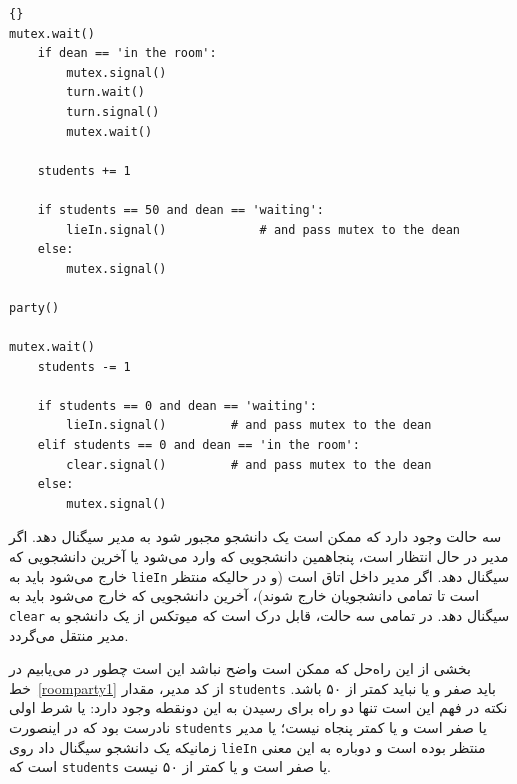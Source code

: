 \documentclass{book}
\begin{document}
\newpage
\begin{latin}
\begin{lstlisting}[title=\rl{راه‌حل اتاق پارتی (دانشجو)}]{}
mutex.wait()
    if dean == 'in the room':
        mutex.signal()
        turn.wait()
        turn.signal()
        mutex.wait()

    students += 1

    if students == 50 and dean == 'waiting':
        lieIn.signal()             # and pass mutex to the dean
    else:
        mutex.signal()

party()

mutex.wait()
    students -= 1

    if students == 0 and dean == 'waiting':
        lieIn.signal()         # and pass mutex to the dean
    elif students == 0 and dean == 'in the room':
        clear.signal()         # and pass mutex to the dean
    else:
        mutex.signal()
\end{lstlisting}
\end{latin}

    سه حالت وجود دارد که ممکن است یک دانشجو مجبور شود به مدیر سیگنال دهد. 
    اگر مدیر در حال انتظار است،  پنجاهمین دانشجویی که وارد می‌شود یا آخرین دانشجویی که خارج می‌شود باید  به {\tt lieIn} سیگنال دهد.
    اگر مدیر داخل اتاق است (و در حالیکه منتظر است تا تمامی دانشجویان خارج شوند)، آخرین دانشجویی که خارج می‌شود باید به {\tt clear} سیگنال دهد. 
    در تمامی سه حالت، قابل درک است که میوتکس از یک دانشجو به مدیر منتقل می‌گردد. 

    بخشی از این راه‌حل که ممکن است واضح نباشد این است چطور در می‌یابیم در خط~\ref{roomparty1} از کد مدیر، مقدار {\tt students}  
    باید صفر و یا نباید کمتر از ۵۰ باشد. نکته در فهم این است تنها دو راه برای رسیدن به این دونقطه وجود دارد: یا شرط اولی نادرست بود 
    که در اینصورت  {\tt students} یا صفر است و یا کمتر پنجاه نیست؛‌ یا مدیر زمانیکه یک دانشجو سیگنال داد روی {\tt lieIn} منتظر بوده است و 
    دوباره به این معنی است که {\tt students}  یا صفر است و یا کمتر از ۵۰ نیست. 
    
\end{document}
